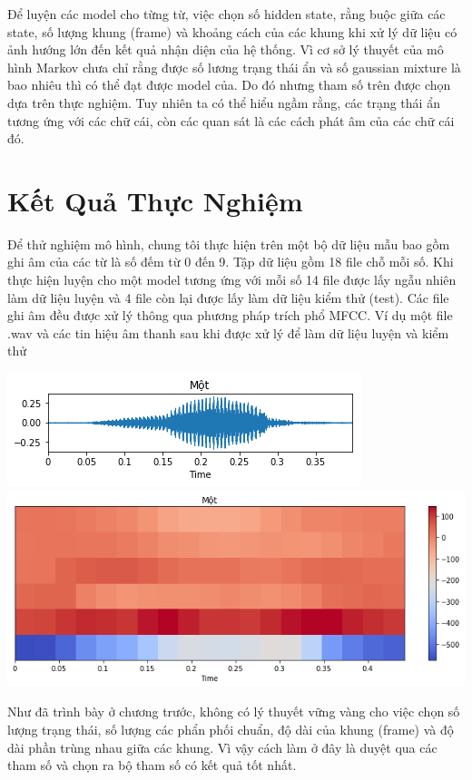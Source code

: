\documentclass[13pt]{extreport}
\begin{document}
Để luyện các model cho từng từ, việc chọn số hidden state, rằng buộc giữa các state, số lượng khung (frame) và khoảng cách của các khung khi xử lý dữ liệu có ảnh hướng lớn đến kết quả nhận diện của hệ thống. Vì cơ sở lý thuyết của mô hình Markov chưa chỉ rằng được số lương trạng thái ẩn và số gaussian mixture là bao nhiêu thì có thể đạt được model của. Do đó nhưng tham số trên được chọn dựa trên thực nghiệm. Tuy nhiên ta có thể hiểu ngầm rằng, các trạng thái ẩn tương ứng với các chữ cái, còn các quan sát là các cách phát âm của các chữ cái đó.

\chapter{Kết Quả Thực Nghiệm}
Để thử nghiệm mô hình, chung tôi thực hiện trên một bộ dữ liệu mẫu bao gồm ghi âm của các từ là số đếm từ 0 đến 9. Tập dữ liệu gồm 18 file chỗ mỗi số. Khi thực hiện luyện cho một model tương ứng với mỗi số 14 file được lấy ngẫu nhiên làm dữ liệu luyện và 4 file còn lại được lấy làm dữ liệu kiểm thử (test). Các file ghi âm đều được xử lý thông qua phương pháp trích phổ MFCC. Ví dụ một file .wav và các tin hiệu âm thanh sau khi được xử lý để làm dữ liệu luyện và kiểm thử \\
\begin{center}
\includegraphics[scale=.9]{wave.png} \\
\includegraphics[scale=.6]{mfcc.png}
\end{center}

Như đã trình bày ở chương trước, không có lý thuyết vững vàng cho việc chọn số lượng trạng thái, số lượng các phẩn phối chuẩn, độ dài của khung (frame) và độ dài phần trùng nhau giữa các khung. Vì vậy cách làm ở đây là duyệt qua các tham số và chọn ra bộ tham số có kết quả tốt nhất. \\
\end{document}
